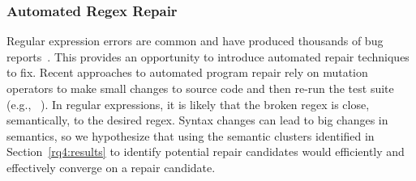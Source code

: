 \subsubsection{Automated Regex Repair}
Regular expression errors are common and have produced thousands of bug reports~\cite{Spishak:2012:TSR:2318202.2318207}. This provides an opportunity to introduce automated repair techniques to fix.
Recent approaches to automated program repair rely on mutation operators to make small changes to source code and then re-run the test suite (e.g., ~\cite{cacm10, genprog-tse-journal}). In regular expressions, it is likely that the broken regex is close, semantically, to the desired regex. Syntax changes can lead to big changes in semantics, so we hypothesize that using the semantic clusters identified in Section~\ref{rq4:results} to identify potential repair candidates would efficiently and effectively converge on a repair candidate.




